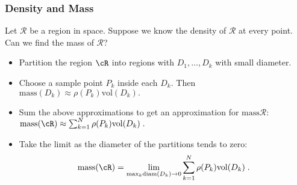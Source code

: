 \begin{frame}
\frametitle{Density and Mass}
\begin{question}
Let $\mathcal R$ be a region in space. Suppose we know the density of $\mathcal R$ at every point. Can we find the mass of $\mathcal R$?
\end{question}
\begin{itemize}
\item<2-> Partition the region $\cR$ into regions with $D_1,\dots, D_k$ with small diameter.  
\item<3-> Choose a sample point $P_k$ inside each $D_k$. Then 
$
\text{mass}(D_k) \approx \rho(P_k) \text{vol}(D_k) .
$
\item<4-> Sum the above approximations to get an approximation for  $\text{mass}\mathcal R$: $\text{mass}(\cR) \approx \sum_{k=1}^{N} \rho(P_k)\text{vol}(D_k)\; .$
\item<5-> Take the limit as the diameter of the partitions tends to zero:
$$\text{mass}(\cR) = \lim_{\text{max}_k\text{diam}(D_k) \to 0}  \sum_{k=1}^{N} \rho(P_k)\text{vol}(D_k)\; .$$
\end{itemize}
\end{frame}
